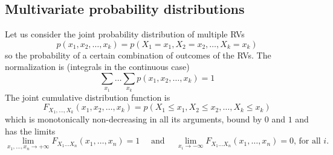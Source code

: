 \subsection{Multivariate probability distributions}
Let us consider the joint probability distribution of multiple RVs
\begin{equation}
    p(x_1, x_2, \dots, x_k) = p(X_1=x_1, X_2=x_2, \dots, X_k=x_k)
\end{equation}
so the probability of a certain combination of outcomes of the RVs.
The normalization is (integrals in the continuous case)
\begin{equation}
    \sum_{x_1} \dots \sum_{x_k} p(x_1, x_2, \dots, x_k) = 1
\end{equation}
The joint cumulative distribution function is
\begin{equation}
    F_{X_1,\dots,X_k}(x_1, x_2, \dots, x_k) = p(X_1 \leq x_1, X_2 \leq x_2, \dots, X_k \leq x_k)
\end{equation}
which is monotonically non-decreasing in all its arguments, bound by $0$ and $1$ and has the limits
\begin{equation}
    \lim _{x_1, \ldots, x_n \rightarrow+\infty} F_{X_1 \ldots X_n}\left(x_1, \ldots, x_n\right)=1 \quad \text { and } \quad \lim _{x_i \rightarrow-\infty} F_{X_1 \ldots X_n}\left(x_1, \ldots, x_n\right)=0 \text {, for all } i \text {. }
\end{equation}

